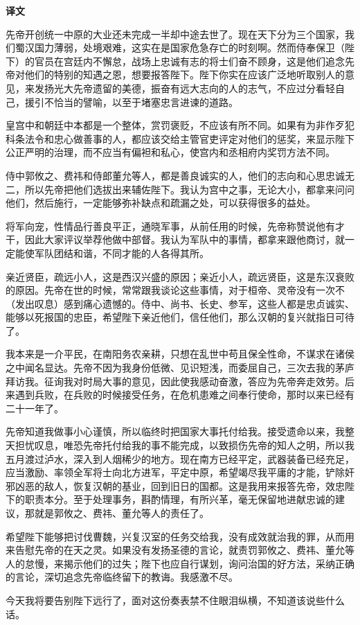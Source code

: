 \documentclass[12pt,UTF-8,openany,a4]{ctexbook}
\begin{document}
\newpage

\begin{Large}
    \noindent\textbf{译文}
\end{Large}


\vspace{1em}

\begin{large}
    \yiwen 
    先帝开创统一中原的大业还未完成一半却中途去世了。现在天下分为三个国家，我们蜀汉国力薄弱，处境艰难，这实在是国家危急存亡的时刻啊。然而侍奉保卫（陛下）的官员在宫廷内不懈怠，战场上忠诚有志的将士们奋不顾身，这是他们追念先帝对他们的特别的知遇之恩，想要报答陛下。陛下你实在应该广泛地听取别人的意见，来发扬光大先帝遗留的美德，振奋有远大志向的人的志气，不应过分看轻自己，援引不恰当的譬喻，以至于堵塞忠言进谏的道路。
    
    皇宫中和朝廷中本都是一个整体，赏罚褒贬，不应该有所不同。如果有为非作歹犯科条法令和忠心做善事的人，都应该交给主管官吏评定对他们的惩奖，来显示陛下公正严明的治理，而不应当有偏袒和私心，使宫内和丞相府内奖罚方法不同。
    
    侍中郭攸之、费祎和侍郎董允等人，都是善良诚实的人，他们的志向和心思忠诚无二，所以先帝把他们选拔出来辅佐陛下。我认为宫中之事，无论大小，都拿来问问他们，然后施行，一定能够弥补缺点和疏漏之处，可以获得很多的益处。
    
    将军向宠，性情品行善良平正，通晓军事，从前任用的时候，先帝称赞说他有才干，因此大家评议举荐他做中部督。我认为军队中的事情，都拿来跟他商讨，就一定能使军队团结和谐，不同才能的人各得其所。
    
    亲近贤臣，疏远小人，这是西汉兴盛的原因；亲近小人，疏远贤臣，这是东汉衰败的原因。先帝在世的时候，常常跟我谈论这些事情，对于桓帝、灵帝没有一次不（发出叹息）感到痛心遗憾的。侍中、尚书、长史、参军，这些人都是忠贞诚实、能够以死报国的忠臣，希望陛下亲近他们，信任他们，那么汉朝的复兴就指日可待了。
    
    我本来是一介平民，在南阳务农亲耕，只想在乱世中苟且保全性命，不谋求在诸侯之中闻名显达。先帝不因为我身份低微、见识短浅，而委屈自己，三次去我的茅庐拜访我。征询我对时局大事的意见，因此使我感动奋激，答应为先帝奔走效劳。后来遇到兵败，在兵败的时候接受任务，在危机患难之间奉行使命，那时以来已经有二十一年了。
    
    先帝知道我做事小心谨慎，所以临终时把国家大事托付给我。接受遗命以来，我整天担忧叹息，唯恐先帝托付给我的事不能完成，以致损伤先帝的知人之明，所以我五月渡过泸水，深入到人烟稀少的地方。现在南方已经平定，武器装备已经充足，应当激励、率领全军将士向北方进军，平定中原，希望竭尽我平庸的才能，铲除奸邪凶恶的敌人，恢复汉朝的基业，回到旧日的国都。这是我用来报答先帝，效忠陛下的职责本分。至于处理事务，斟酌情理，有所兴革，毫无保留地进献忠诚的建议，那就是郭攸之、费祎、董允等人的责任了。
    
    希望陛下能够把讨伐曹魏，兴复汉室的任务交给我，没有成效就治我的罪，从而用来告慰先帝的在天之灵。如果没有发扬圣德的言论，就责罚郭攸之、费祎、董允等人的怠慢，来揭示他们的过失；陛下也应自行谋划，询问治国的好方法，采纳正确的言论，深切追念先帝临终留下的教诲。我感激不尽。
    
    今天我将要告别陛下远行了，面对这份奏表禁不住眼泪纵横，不知道该说些什么话。
    
\end{large}
\end{document}
